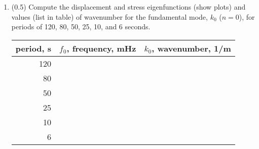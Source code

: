 \documentclass[11pt,titlepage,fleqn]{article}
\begin{document}
\begin{enumerate}
\begin{enumerate}
\item (0.0) Given a period of $T = 20$, list the starting and finishing $k$ values in your \verb+kvec+.

\item (1.5) Using the model described in Problem~1-\ref{prob:model1}, compute the displacement and stress eigenfunctions for the period $T = 20$.

Check that your root is $k_0 = 8.53 \times 10^{-5}$~1/m.

Show your code for \verb+stress_disp_love.m+ and \verb+earthfun_love.m+.

\item (1.0) Show a plot of the eigenfunctions; draw a line at the base of the layer.

Suggestion: For plotting purposes only, you may find it simpler to transform your $r$~values into depth values, with $z=0$ at the surface. You can then use \\ \verb+set(gca,'ydir','reverse');+ to flip the direction of the $y$-axis.

\item (0.0) What is the normalized value of stress at the surface, $T(r_a)\,/\max(|T(r)|)$?

\item (1.0) Check the system of equations () for this solution (see modes homework solutions). You should get much better agreement if you lower the tolerance levels for \verb+ode45+.

\item (0.0) What is the normalized value of stress at the surface, $T(r_a)\,/\max(|T(r)|)$?

After you do the check, you can go back to using the default tolerance.
\end{enumerate}


\item (0.5) Compute the displacement and stress eigenfunctions (show plots) and values (list in table) of wavenumber for the fundamental mode, $k_0$ ($n=0$), for periods of 120, 80, 50, 25, 10, and 6 seconds.

\begin{spacing}{1.5}
\begin{tabular}{r|r|r}
\hline\hline
period, s & $f_0$, frequency, mHz & $k_0$, wavenumber, 1/m  \\ \hline\hline
120 & & \\ \hline
80 & & \\ \hline
50 & &  \\ \hline
25 & & \\ \hline
10 & & \\ \hline
6 & &  \\ \hline
\end{tabular}
\end{spacing}



\end{enumerate}
\end{document}
